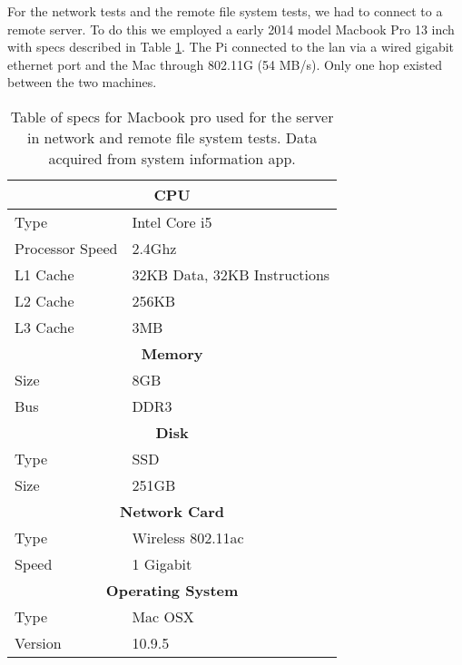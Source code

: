 For the network tests and the remote file system tests, we had to connect to a remote server.
To do this we employed a early 2014 model Macbook Pro 13 inch with specs described in Table \ref{tbl:macbookspecs}.
The Pi connected to the lan via a wired gigabit ethernet port and the Mac through 802.11G (54 MB/s).
Only one hop existed between the two machines.

\begin{table}[h]
\centering
\begin{tabular}{|l|l|}
\hline
\multicolumn{2}{|c|}{\textbf{CPU}}              \\ \hline
Type                 & Intel Core i5         \\ \hline
Processor Speed & 2.4Ghz                    \\ \hline
L1 Cache             & 32KB Data, 32KB Instructions          \\ \hline
L2 Cache             & 256KB           \\ \hline
L3 Cache             & 3MB           \\ \hline
\multicolumn{2}{|c|}{\textbf{Memory}}           \\ \hline
Size                 &  8GB          \\ \hline
Bus                  & DDR3                     \\ \hline
\multicolumn{2}{|c|}{\textbf{Disk}}             \\ \hline
Type                 & SSD           \\ \hline
Size                 & 251GB                     \\ \hline
\multicolumn{2}{|c|}{\textbf{Network Card}}     \\ \hline
Type                 & Wireless 802.11ac \\ \hline
Speed                &1 Gigabit                  \\ \hline
\multicolumn{2}{|c|}{\textbf{Operating System}} \\ \hline
Type                 & Mac OSX                      \\ \hline
Version             & 10.9.5 \\\hline
\end{tabular}
\caption{Table of specs for Macbook pro used for the server in network and remote file system tests.  Data acquired from system information app.}
\label{tbl:macbookspecs}
\end{table}